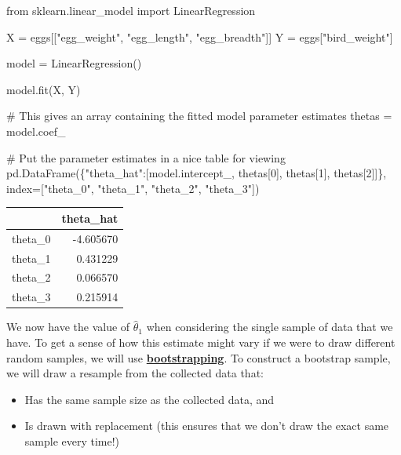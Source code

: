 \documentclass[
  letterpaper,
  DIV=11,
  numbers=noendperiod]{scrreprt}
\newenvironment{Shaded}{\begin{snugshade}}{\end{snugshade}}
\newcommand{\CommentTok}[1]{\textcolor[rgb]{0.37,0.37,0.37}{#1}}
\newcommand{\DecValTok}[1]{\textcolor[rgb]{0.68,0.00,0.00}{#1}}
\newcommand{\ImportTok}[1]{\textcolor[rgb]{0.00,0.46,0.62}{#1}}
\newcommand{\NormalTok}[1]{\textcolor[rgb]{0.00,0.23,0.31}{#1}}
\newcommand{\OperatorTok}[1]{\textcolor[rgb]{0.37,0.37,0.37}{#1}}
\newcommand{\StringTok}[1]{\textcolor[rgb]{0.13,0.47,0.30}{#1}}
\providecommand{\tightlist}{%
  \setlength{\itemsep}{0pt}\setlength{\parskip}{0pt}}\usepackage{longtable,booktabs,array}
\begin{document}
\begin{Shaded}
\begin{Highlighting}[]
\ImportTok{from}\NormalTok{ sklearn.linear\_model }\ImportTok{import}\NormalTok{ LinearRegression}

\NormalTok{X }\OperatorTok{=}\NormalTok{ eggs[[}\StringTok{"egg\_weight"}\NormalTok{, }\StringTok{"egg\_length"}\NormalTok{, }\StringTok{"egg\_breadth"}\NormalTok{]]}
\NormalTok{Y }\OperatorTok{=}\NormalTok{ eggs[}\StringTok{"bird\_weight"}\NormalTok{]}

\NormalTok{model }\OperatorTok{=}\NormalTok{ LinearRegression()}

\NormalTok{model.fit(X, Y)}

\CommentTok{\# This gives an array containing the fitted model parameter estimates}
\NormalTok{thetas }\OperatorTok{=}\NormalTok{ model.coef\_}

\CommentTok{\# Put the parameter estimates in a nice table for viewing}
\NormalTok{pd.DataFrame(\{}\StringTok{"theta\_hat"}\NormalTok{:[model.intercept\_, thetas[}\DecValTok{0}\NormalTok{], thetas[}\DecValTok{1}\NormalTok{], thetas[}\DecValTok{2}\NormalTok{]]\}, index}\OperatorTok{=}\NormalTok{[}\StringTok{"theta\_0"}\NormalTok{, }\StringTok{"theta\_1"}\NormalTok{, }\StringTok{"theta\_2"}\NormalTok{, }\StringTok{"theta\_3"}\NormalTok{])}
\end{Highlighting}
\end{Shaded}

\begin{tabular}{lr}
\toprule
{} &  theta\_hat \\
\midrule
theta\_0 &  -4.605670 \\
theta\_1 &   0.431229 \\
theta\_2 &   0.066570 \\
theta\_3 &   0.215914 \\
\bottomrule
\end{tabular}

We now have the value of \(\hat{\theta}_1\) when considering the single
sample of data that we have. To get a sense of how this estimate might
vary if we were to draw different random samples, we will use
\textbf{\href{https://inferentialthinking.com/chapters/13/2/Bootstrap.html?}{bootstrapping}}.
To construct a bootstrap sample, we will draw a resample from the
collected data that:

\begin{itemize}
\tightlist
\item
  Has the same sample size as the collected data, and
\item
  Is drawn with replacement (this ensures that we don't draw the exact
  same sample every time!)
\end{itemize}
\end{document}
